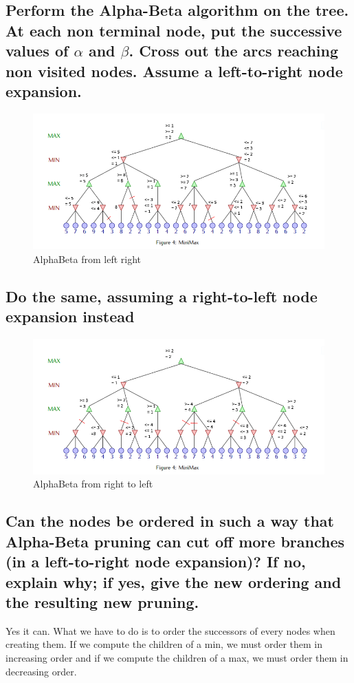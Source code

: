 \documentclass[a4paper,10pt]{article}
\begin{document}
		\subsection{Perform the Alpha-Beta algorithm on the tree. At each non terminal node, put the successive values of $\alpha$ and $\beta$. Cross out the arcs reaching non visited nodes. Assume a left-to-right node expansion.}		
		\begin{figure}[h!]
			\centering
				\includegraphics[scale=0.8]{tree-fig5.png}
			\caption{AlphaBeta from left right}
		\end{figure}
		\subsection{Do the same, assuming a right-to-left node expansion instead}
		\begin{figure}[h!]
			\centering
				\includegraphics[scale=0.8]{tree-fig6.png}
			\caption{AlphaBeta from right to left}
		\end{figure}
		\subsection{Can the nodes be ordered in such a way that Alpha-Beta pruning can cut off more branches (in a left-to-right node expansion)? If no, explain why; if yes,
give the new ordering and the resulting new pruning.}
		Yes it can. What we have to do is to order the successors of every nodes when creating them. If we compute the children of a min, we must order them in increasing order and if we compute the children of a max, we must order them in decreasing order.
\end{document}
